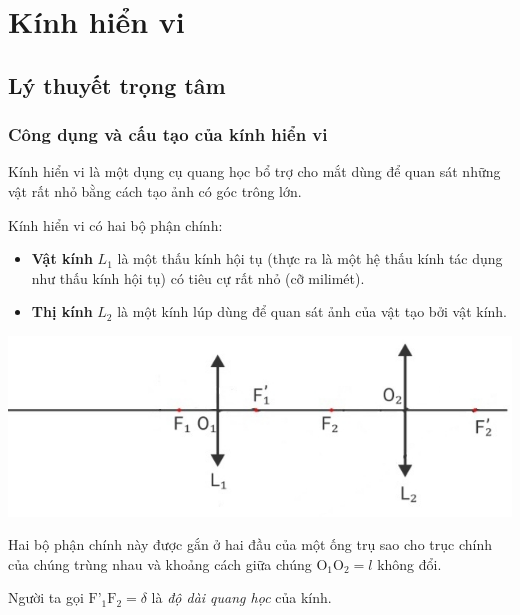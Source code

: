 
\chapter{Kính hiển vi}
\section{Lý thuyết trọng tâm}

\subsection{Công dụng và cấu tạo của kính hiển vi}
Kính hiển vi là một dụng cụ quang học bổ trợ cho mắt dùng để quan sát
những vật rất nhỏ bằng cách tạo ảnh có góc trông lớn.

Kính hiển vi có hai bộ phận chính:
\begin{itemize}
	\item \textbf{Vật kính} $L_1$ là một thấu kính hội tụ (thực ra là một hệ thấu kính tác dụng như thấu kính hội tụ) có tiêu cự rất nhỏ (cỡ milimét).
	\item \textbf{Thị kính} $L_2$ là một kính lúp dùng để quan sát ảnh của vật tạo bởi vật kính.
	\end{itemize}
\begin{center}
	\includegraphics[scale=0.4]{../figs/VN11-PH-42-L-030-1-h52.jpg}
\end{center}
Hai bộ phận chính này được gắn ở hai đầu của một ống trụ sao cho trục chính của chúng trùng nhau và khoảng cách giữa chúng $\text{O}_1\text{O}_2=l$ không đổi.

Người ta gọi $\text{F'}_1\text{F}_2=\delta$ là \textit{độ dài quang học} của kính.

